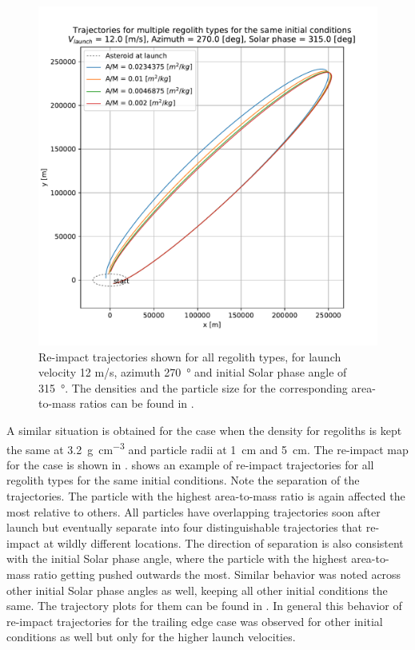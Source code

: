 \begin{figure}[htb]
\centering
\captionsetup{justification=centering}
\includegraphics[width=\textwidth, height=0.5\textheight, keepaspectratio=true]{trailing_edge_perturbations/reimpact_traj_12ms_270Azim_315solarPhase.pdf}
\caption{Re-impact trajectories shown for all regolith types, for launch velocity 12 m/s, azimuth \SI{270}{\degree} and initial Solar phase angle of \SI{315}{\degree}. The densities and the particle size for the corresponding area-to-mass ratios can be found in .}
\label{fig:trailingEdge_reimpact_traj_12ms_270azim_315solar}
\end{figure}
\FloatBarrier
A similar situation is obtained for the case when the density for regoliths is kept the same at \SI{3.2}{\gram\per\centi\metre\cubed} and particle radii at \SI{1}{\centi\metre} and \SI{5}{\centi\metre}. The re-impact map for the case is shown in .  shows an example of re-impact trajectories for all regolith types for the same initial conditions. Note the separation of the trajectories. The particle with the highest area-to-mass ratio is again affected the most relative to others. All particles have overlapping trajectories soon after launch but eventually separate into four distinguishable trajectories that re-impact at wildly different locations. The direction of separation is also consistent with the initial Solar phase angle, where the particle with the highest area-to-mass ratio getting pushed outwards the most. Similar behavior was noted across other initial Solar phase angles as well, keeping all other initial conditions the same. The trajectory plots for them can be found in . In general this behavior of re-impact trajectories for the trailing edge case was observed for other initial conditions as well but only for the higher launch velocities.
